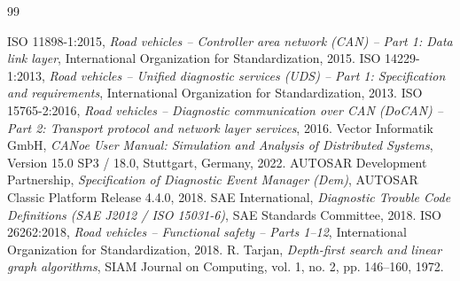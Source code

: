 \documentclass[11pt,a4paper]{article}
\begin{document}
\begin{thebibliography}{99}
\footnotesize
{} ISO 11898-1:2015, \emph{Road vehicles -- Controller area network (CAN) -- Part 1: Data link layer}, International Organization for Standardization, 2015.
 ISO 14229-1:2013, \emph{Road vehicles -- Unified diagnostic services (UDS) -- Part 1: Specification and requirements}, International Organization for Standardization, 2013.
 ISO 15765-2:2016, \emph{Road vehicles -- Diagnostic communication over CAN (DoCAN) -- Part 2: Transport protocol and network layer services}, 2016.
 Vector Informatik GmbH, \emph{CANoe User Manual: Simulation and Analysis of Distributed Systems}, Version 15.0 SP3 / 18.0, Stuttgart, Germany, 2022.
 AUTOSAR Development Partnership, \emph{Specification of Diagnostic Event Manager (Dem)}, AUTOSAR Classic Platform Release 4.4.0, 2018.
 SAE International, \emph{Diagnostic Trouble Code Definitions (SAE J2012 / ISO 15031-6)}, SAE Standards Committee, 2018.
 ISO 26262:2018, \emph{Road vehicles -- Functional safety -- Parts 1--12}, International Organization for Standardization, 2018.
 R. Tarjan, \emph{Depth-first search and linear graph algorithms}, SIAM Journal on Computing, vol. 1, no. 2, pp. 146--160, 1972.
\end{thebibliography}
\end{document}
